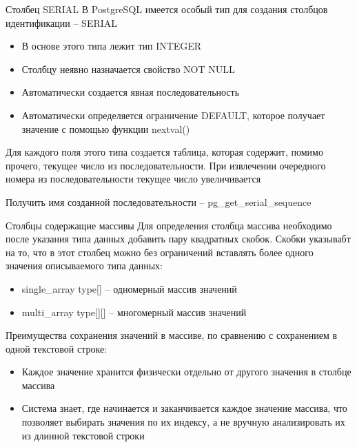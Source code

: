 \documentclass[12pt]{article}
\begin{document}
\begin{nota}{Столбец SERIAL}
    В PostgreSQL имеется особый тип для создания столбцов идентификации -- SERIAL

    \begin{itemize}
        \item В основе этого типа лежит тип INTEGER 
        \item Столбцу неявно назначается свойство NOT NULL 
        \item Автоматически создается явная последовательность 
        \item Автоматически определяется ограничение DEFAULT, которое получает значение с помощью функции nextval() 
    \end{itemize}

    Для каждого поля этого типа создается таблица, которая содержит, помимо прочего, текущее число из последовательности. При извлечении очередного номера из последовательности текущее число увеличивается 

    Получить имя созданной последовательности -- pg\_get\_serial\_sequence
\end{nota}

\begin{nota}{Столбцы содержащие массивы}
    Для определения столбца массива необходимо после указания типа данных добавить пару квадратных скобок. Скобки указывабт на то, что в этот столбец можно без ограничений вставлять более одного значения описываемого типа данных: 

    \begin{itemize}
        \item single\_array type[] -- одномерный массив значений 
        \item multi\_array type[][] -- многомерный массив значений
    \end{itemize}

    Преимущества сохранения значений в массиве, по сравнению с сохранением в одной текстовой строке: 

    \begin{itemize}
        \item Каждое значение хранится физически отдельно от другого значения в столбце массива 
        \item Система знает, где начинается и заканчивается каждое значение массива, что позволяет выбирать значения по их индексу, а не вручную анализировать их из длинной текстовой строки 
    \end{itemize}
\end{nota}
\end{document}
